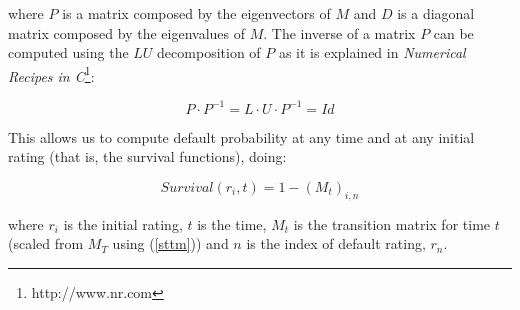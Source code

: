 \documentclass[a4paper,12pt,final]{article}
\begin{document}
where $P$ is a matrix composed by the eigenvectors of $M$ and $D$ is a diagonal 
matrix composed by the eigenvalues of $M$. The inverse of a matrix $P$ can be 
computed using the $LU$ decomposition of $P$ as it is explained in \emph{Numerical 
Recipes in C}\footnote{http://www.nr.com}:

\begin{displaymath}
P \cdot P^{-1} = L \cdot U \cdot P^{-1} = Id
\end{displaymath}

This allows us to compute default probability at any time and at any initial 
rating (that is, the survival functions), doing:

\begin{displaymath}
Survival(r_i, t) = 1 - \left( M_t \right)_{i, n}
\end{displaymath}

where $r_i$ is the initial rating, $t$ is the time, $M_t$ is the transition 
matrix for time $t$ (scaled from $M_T$ using (\ref{sttm})) and $n$ is the 
index of default rating, $r_n$.


\newpage


\end{document}

